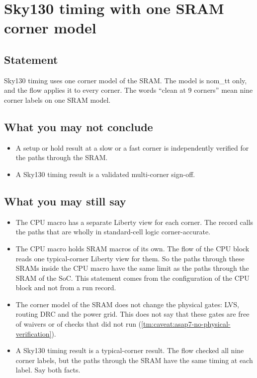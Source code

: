 \section{Sky130 timing with one SRAM corner model}\label{tm:caveat:sky130-single-sram-corner}
\subsection*{Statement}
Sky130 timing uses one corner model of the SRAM. The model is nom\_tt only, and the flow applies it to every corner. The words ``clean at 9 corners'' mean nine corner labels on one SRAM model.

\subsection*{What you may not conclude}
\begin{itemize}
  \item A setup or hold result at a slow or a fast corner is independently verified for the paths through the SRAM.
  \item A Sky130 timing result is a validated multi-corner sign-off.
\end{itemize}

\subsection*{What you may still say}
\begin{itemize}
  \item The CPU macro has a separate Liberty view for each corner. The record calls the paths that are wholly in standard-cell logic corner-accurate.
  \item The CPU macro holds SRAM macros of its own. The flow of the CPU block reads one typical-corner Liberty view for them. So the paths through these SRAMs inside the CPU macro have the same limit as the paths through the SRAM of the SoC. This statement comes from the configuration of the CPU block and not from a run record.
  \item The corner model of the SRAM does not change the physical gates: LVS, routing DRC and the power grid. This does not say that these gates are free of waivers or of checks that did not run (\cref{tm:caveat:asap7-no-physical-verification}).
  \item A Sky130 timing result is a typical-corner result. The flow checked all nine corner labels, but the paths through the SRAM have the same timing at each label. Say both facts.
\end{itemize}

